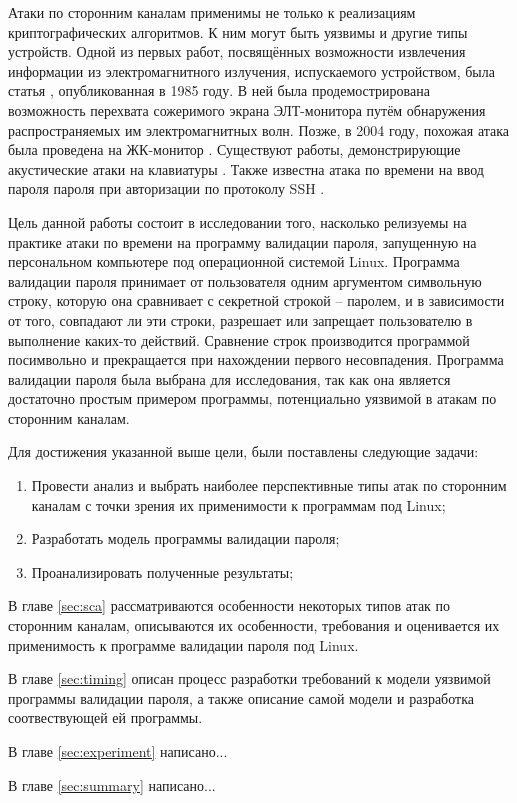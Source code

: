 Атаки по сторонним каналам применимы не только к реализациям криптографических
алгоритмов. К ним могут быть уязвимы и другие типы устройств. Одной из первых
работ, посвящённых возможности извлечения информации из электромагнитного
излучения, испускаемого устройством, была статья \cite{van-eck}, опубликованная
в 1985 году. В ней была продемострирована возможность перехвата сожеримого
экрана ЭЛТ-монитора путём обнаружения распространяемых им электромагнитных волн.
Позже, в 2004 году, похожая атака была проведена на ЖК-монитор \cite{kuhn}.
Существуют работы, демонстрирующие акустические атаки на клавиатуры
\cite{asonov} \cite{zhuang}. Также известна атака по времени на ввод пароля пароля
при авторизации по протоколу SSH \cite{ssh}.

Цель данной работы состоит в исследовании того, насколько релизуемы на практике
атаки по времени на программу валидации пароля, запущенную на персональном
компьютере под операционной системой Linux. Программа валидации пароля
принимает от пользователя одним аргументом символьную строку, которую она
сравнивает с секретной строкой -- паролем, и в зависимости от того, совпадают
ли эти строки, разрешает или запрещает пользователю в выполнение каких-то
действий. Сравнение строк производится программой посимвольно и прекращается
при нахождении первого несовпадения. Программа валидации пароля была выбрана
для исследования, так как она является достаточно простым примером программы,
потенциально уязвимой в атакам по сторонним каналам.

Для достижения указанной выше цели, были поставлены следующие задачи:
\begin{enumerate}
\item Провести анализ и выбрать наиболее перспективные типы атак по сторонним
  каналам с точки зрения их применимости к программам под Linux;
\item Разработать модель программы валидации пароля;
\item Проанализировать полученные результаты;
\end{enumerate}

В главе \ref{sec:sca} рассматриваются особенности некоторых типов атак по
сторонним каналам, описываются их особенности, требования и оценивается
их применимость к программе валидации пароля под Linux.

В главе \ref{sec:timing} описан процесс разработки требований к модели уязвимой
программы валидации пароля, а также описание самой модели и разработка
соотвествующей ей программы.

В главе \ref{sec:experiment} написано...

В главе \ref{sec:summary} написано...

\clearpage
